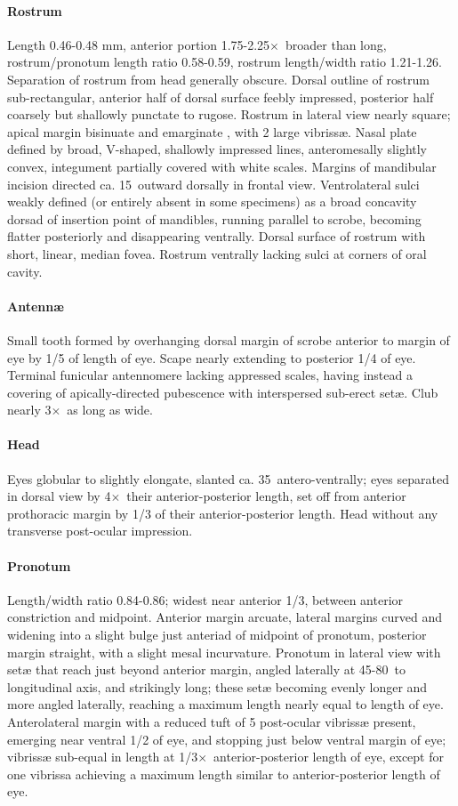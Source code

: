 \documentclass[fleqn,10pt,lineno]{wlpeerj} %
\newcommand{\td}{\textdegree~}
\newcommand{\x}{$\times$~}
\begin{document}
			\paragraph{Rostrum}
				Length 0.46-0.48 mm, anterior portion 1.75-2.25\x broader than long, rostrum/pronotum length ratio 0.58-0.59, rostrum length/width ratio 1.21-1.26.
				Separation of rostrum from head generally obscure. 
				Dorsal outline of rostrum sub-rectangular, anterior half of dorsal surface feebly impressed, posterior half coarsely but shallowly punctate to rugose. 
				Rostrum in lateral view nearly square; apical margin bisinuate and emarginate , with 2 large vibriss{\ae}. 
				Nasal plate defined by broad, V-shaped, shallowly impressed lines, anteromesally slightly convex, integument partially covered with white scales. 
				Margins of mandibular incision directed ca. 15\td outward dorsally in frontal view. 
				Ventrolateral sulci weakly defined (or entirely absent in some specimens) as a broad concavity dorsad of insertion point of mandibles, running parallel to scrobe, becoming flatter posteriorly and disappearing ventrally.
				Dorsal surface of rostrum with  short, linear, median fovea.
				Rostrum ventrally lacking sulci at corners of oral cavity.
			\paragraph{Antenn{\ae}}
				Small tooth formed by overhanging dorsal margin of scrobe anterior to margin of eye by 1/5 of length of eye.
				Scape nearly extending to posterior 1/4 of eye.
				Terminal funicular antennomere lacking appressed scales, having instead a covering of apically-directed pubescence with interspersed sub-erect set{\ae}.
				Club nearly 3\x as long as wide.
			\paragraph{Head}
				Eyes globular to slightly elongate, slanted ca. 35\td antero-ventrally; eyes separated in dorsal view by 4\x their anterior-posterior length, set off from anterior prothoracic margin by 1/3 of their anterior-posterior length. 
				Head without any transverse post-ocular impression.
			\paragraph{Pronotum}
				Length/width ratio 0.84-0.86; widest near anterior 1/3, between anterior constriction and midpoint. 
				Anterior margin arcuate, lateral margins curved and widening into a slight bulge just anteriad of midpoint of pronotum, posterior margin straight, with a slight mesal incurvature. 
				Pronotum in lateral view with set{\ae} that reach just beyond anterior margin, angled laterally at 45-80\td to longitudinal axis, and strikingly long; these set{\ae} becoming evenly longer and more angled laterally, reaching a maximum length nearly equal to length of eye. 
				Anterolateral margin with a reduced tuft of 5 post-ocular vibriss{\ae} present, emerging near ventral 1/2 of eye, and stopping just below ventral margin of eye; vibriss{\ae} sub-equal in length at 1/3\x anterior-posterior length of eye, except for one vibrissa achieving a maximum length similar to anterior-posterior length of eye.
\end{document}

